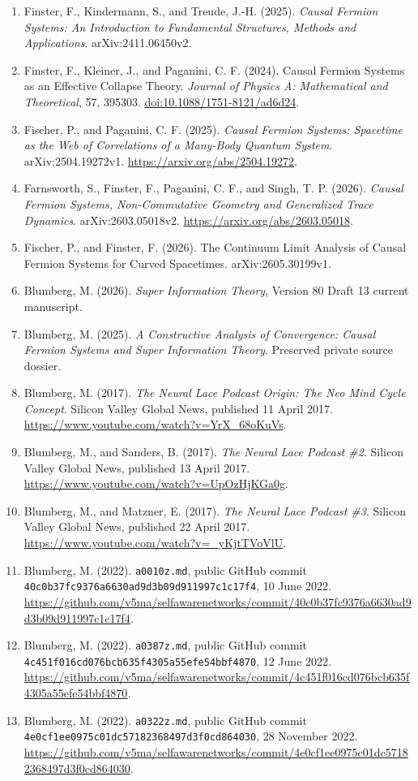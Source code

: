 \documentclass[
  american,
  11pt,
  letterpaper,
]{article}
\providecommand{\tightlist}{%
  \setlength{\itemsep}{0pt}\setlength{\parskip}{0pt}}
\begin{document}
\begin{enumerate}
\def\labelenumi{\arabic{enumi}.}
\tightlist
\item
  Finster, F., Kindermann, S., and Treude, J.-H. (2025). \emph{Causal Fermion Systems: An Introduction to Fundamental Structures, Methods and Applications}. arXiv:2411.06450v2.
\item
  Finster, F., Kleiner, J., and Paganini, C. F. (2024). Causal Fermion Systems as an Effective Collapse Theory. \emph{Journal of Physics A: Mathematical and Theoretical}, 57, 395303. \url{doi:10.1088/1751-8121/ad6d24}.
\item
  Fischer, P., and Paganini, C. F. (2025). \emph{Causal Fermion Systems: Spacetime as the Web of Correlations of a Many-Body Quantum System}. arXiv:2504.19272v1. \url{https://arxiv.org/abs/2504.19272}.
\item
  Farnsworth, S., Finster, F., Paganini, C. F., and Singh, T. P. (2026). \emph{Causal Fermion Systems, Non-Commutative Geometry and Generalized Trace Dynamics}. arXiv:2603.05018v2. \url{https://arxiv.org/abs/2603.05018}.
\item
  Fischer, P., and Finster, F. (2026). The Continuum Limit Analysis of Causal Fermion Systems for Curved Spacetimes. arXiv:2605.30199v1.
\item
  Blumberg, M. (2026). \emph{Super Information Theory}, Version 80 Draft 13 current manuscript.
\item
  Blumberg, M. (2025). \emph{A Constructive Analysis of Convergence: Causal Fermion Systems and Super Information Theory}. Preserved private source dossier.
\item
  Blumberg, M. (2017). \emph{The Neural Lace Podcast Origin: The Neo Mind Cycle Concept}. Silicon Valley Global News, published 11 April 2017. \url{https://www.youtube.com/watch?v=YrX_68oKuVs}.
\item
  Blumberg, M., and Sanders, B. (2017). \emph{The Neural Lace Podcast \#2}. Silicon Valley Global News, published 13 April 2017. \url{https://www.youtube.com/watch?v=UpOzHjKGa0g}.
\item
  Blumberg, M., and Matzner, E. (2017). \emph{The Neural Lace Podcast \#3}. Silicon Valley Global News, published 22 April 2017. \url{https://www.youtube.com/watch?v=_yKjtTVoVlU}.
\item
  Blumberg, M. (2022). \texttt{a0010z.md}, public GitHub commit \nolinkurl{40c0b37fc9376a6630ad9d3b09d911997c1c17f4}, 10 June 2022. \url{https://github.com/v5ma/selfawarenetworks/commit/40c0b37fc9376a6630ad9d3b09d911997c1c17f4}.
\item
  Blumberg, M. (2022). \texttt{a0387z.md}, public GitHub commit \nolinkurl{4c451f016cd076bcb635f4305a55efe54bbf4870}, 12 June 2022. \url{https://github.com/v5ma/selfawarenetworks/commit/4c451f016cd076bcb635f4305a55efe54bbf4870}.
\item
  Blumberg, M. (2022). \texttt{a0322z.md}, public GitHub commit \nolinkurl{4e0cf1ee0975c01dc57182368497d3f0cd864030}, 28 November 2022. \url{https://github.com/v5ma/selfawarenetworks/commit/4e0cf1ee0975c01dc57182368497d3f0cd864030}.
\end{enumerate}
\end{document}
